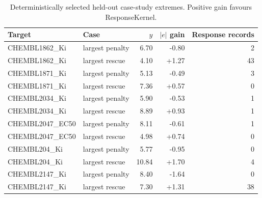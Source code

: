 \begin{table}[t]
\centering
\small
\caption{Deterministically selected held-out case-study extremes. Positive gain favours ResponseKernel.}
\begin{tabular}{llrrr}
\toprule
Target & Case & $y$ & $|e|$ gain & Response records\\
\midrule
CHEMBL1862\_Ki & largest penalty & 6.70 & -0.80 & 2\\
CHEMBL1862\_Ki & largest rescue & 4.10 & +1.27 & 43\\
CHEMBL1871\_Ki & largest penalty & 5.13 & -0.49 & 3\\
CHEMBL1871\_Ki & largest rescue & 7.36 & +0.57 & 0\\
CHEMBL2034\_Ki & largest penalty & 5.90 & -0.53 & 1\\
CHEMBL2034\_Ki & largest rescue & 8.89 & +0.93 & 1\\
CHEMBL2047\_EC50 & largest penalty & 8.11 & -0.61 & 1\\
CHEMBL2047\_EC50 & largest rescue & 4.98 & +0.74 & 0\\
CHEMBL204\_Ki & largest penalty & 5.77 & -0.95 & 0\\
CHEMBL204\_Ki & largest rescue & 10.84 & +1.70 & 4\\
CHEMBL2147\_Ki & largest penalty & 8.40 & -1.64 & 0\\
CHEMBL2147\_Ki & largest rescue & 7.30 & +1.31 & 38\\
\bottomrule
\end{tabular}
\label{tab:extended-cases}
\end{table}
